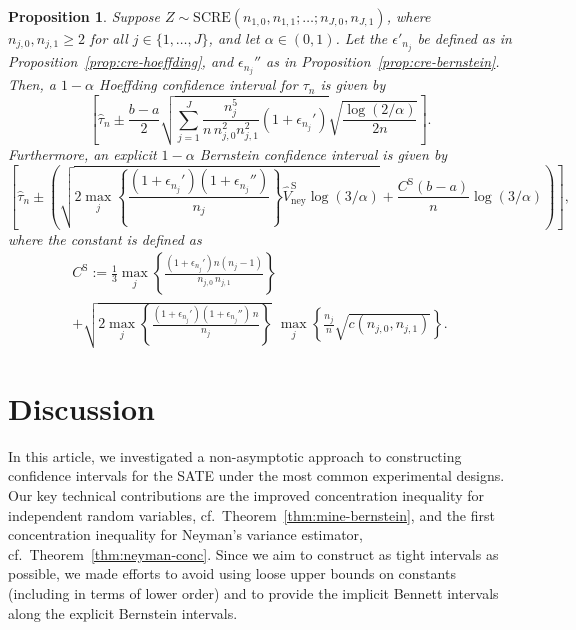 \documentclass[aos]{imsart2}
\theoremstyle{plain}
\newtheorem{proposition}[theorem]{Proposition}
\theoremstyle{definition}
\newcommand{\vhn}{\hat{V}_{\mathrm{ney}}}
\newcommand{\vhns}{\vhn^\mathrm{S}}
\newcommand{\tauh}{\hat{\tau}}
\begin{document}
\begin{proposition}\label{prop:scre}
    Suppose $Z \sim \mathrm{SCRE}(n_{1,0}, n_{1,1};\ldots; n_{J,0}, n_{J,1})$, where $n_{j,0},n_{j,1}\geq 2$ for all $j\in\{1,\ldots,J\}$, and let $\alpha \in (0,1)$. Let the $\epsilon'_{n_j}$ be defined as in Proposition~\ref{prop:cre-hoeffding}, and $\epsilon_{n_j}''$ as in Proposition~\ref{prop:cre-bernstein}. Then, a $1-\alpha$ Hoeffding confidence interval for $\tau_n$ is given by
    \begin{equation*}
        \left[\tauh_n \pm \frac{b-a}{2}\sqrt{\sum_{j=1}^J\frac{n_j^5}{n\,n_{j,0}^2n_{j,1}^2}(1+\epsilon_{n_j}')}\sqrt{\frac{\log(2/\alpha)}{2n}}\right].
    \end{equation*}
    Furthermore, an explicit $1-\alpha$ Bernstein confidence interval is given by
    \begin{equation*}
        \left[\tauh_n \pm \left(\sqrt{2 \max_j\left\{\frac{(1+\epsilon_{n_j}')(1+\epsilon_{n_j}'')}{n_j}\right\} \vhns \log(3/\alpha)} + \frac{C^\mathrm{S}(b-a)}{n}\log(3/\alpha)\right)\right],
    \end{equation*}
    where the constant is defined as
    \begin{multline*}
        C^\mathrm{S} := \frac{1}{3} \max_j \left\{\frac{(1+\epsilon_{n_j}')n(n_j-1)}{n_{j,0}\,n_{j,1}}\right\}\\
        + \sqrt{2\max_j\left\{\frac{(1+\epsilon_{n_j}')(1+\epsilon_{n_j}'')\,n}{n_j}\right\}} \,\,\max_{j} \left\{\frac{n_j}{n}\sqrt{c(n_{j,0},n_{j,1})}\right\}.
    \end{multline*}
\end{proposition}



\section{Discussion}\label{sec:discussion}
In this article, we investigated a non-asymptotic approach to constructing confidence intervals for the SATE under the most common experimental designs. Our key technical contributions are the improved concentration inequality for independent random variables, cf.\ Theorem~\ref{thm:mine-bernstein}, and the first concentration inequality for Neyman's variance estimator, cf.\ Theorem~\ref{thm:neyman-conc}. Since we aim to construct as tight intervals as possible, we made efforts to avoid using loose upper bounds on constants (including in terms of lower order) and to provide the implicit Bennett intervals along the explicit Bernstein intervals.
\end{document}
